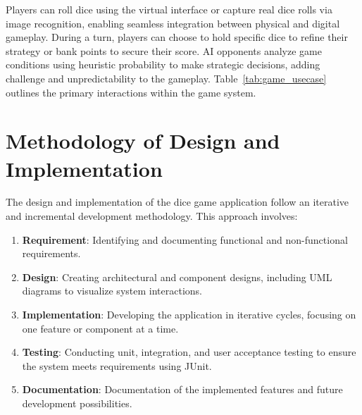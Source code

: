 Players can roll dice using the virtual interface or capture real dice rolls via image recognition, enabling seamless integration between physical and digital gameplay. During a turn, players can choose to hold specific dice to refine their strategy or bank points to secure their score. AI opponents analyze game conditions using heuristic probability to make strategic decisions, adding challenge and unpredictability to the gameplay. Table~\ref{tab:game_usecase} outlines the primary interactions within the game system.


\section{Methodology of Design and Implementation}

The design and implementation of the dice game application follow an iterative and incremental development methodology. This approach involves:
\begin{enumerate}
    \item \textbf{Requirement}: Identifying and documenting functional and non-functional requirements.
    \item \textbf{Design}: Creating architectural and component designs, including UML diagrams to visualize system interactions.
    \item \textbf{Implementation}: Developing the application in iterative cycles, focusing on one feature or component at a time.
    \item \textbf{Testing}: Conducting unit, integration, and user acceptance testing to ensure the system meets requirements using JUnit.
    \item \textbf{Documentation}: Documentation of the implemented features and future development possibilities.
\end{enumerate}

